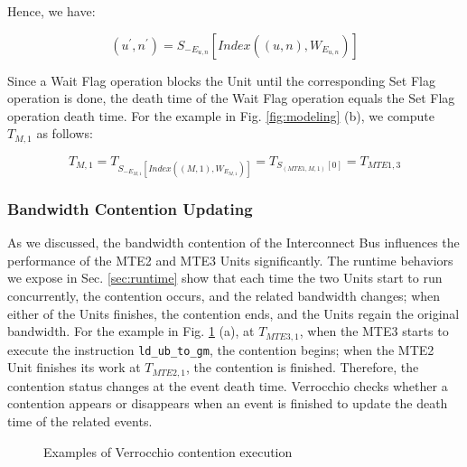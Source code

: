 Hence, we have:

\begin{equation}
(u^{\prime}, n^{\prime}) = S_{- E_{u, n}}[Index((u, n), W_{E_{u, n}})]
\end{equation}

Since a Wait Flag operation blocks the Unit until the corresponding Set Flag operation is done, the death time of the Wait Flag operation equals the Set Flag operation death time. For the example in Fig. \ref{fig:modeling} (b), we compute $T_{M, 1}$ as follows:

\begin{equation}
\label{eq:wait}
T_{M, 1} = T_{S_{-E_{M, 1}}[Index((M, 1), W_{E_{M, 1}})]}
    = T_{S_{(MTE1, M, 1)}[0]}
    = T_{MTE1, 3}
\end{equation}

\subsubsection{Bandwidth Contention Updating}

As we discussed, the bandwidth contention of the Interconnect Bus influences the performance of the MTE2 and MTE3 Units significantly. The runtime behaviors we expose in Sec. \ref{sec:runtime} show that each time the two Units start to run concurrently, the contention occurs, and the related bandwidth changes; when either of the Units finishes, the contention ends, and the Units regain the original bandwidth. For the example in Fig. \ref{fig:contention} (a), at $T_{MTE3, 1}$, when the MTE3 starts to execute the instruction \verb|ld_ub_to_gm|, the contention begins; when the MTE2 Unit finishes its work at $T_{MTE2, 1}$, the contention is finished. Therefore, the contention status changes at the event death time. Verrocchio checks whether a contention appears or disappears when an event is finished to update the death time of the related events.

\begin{figure}[tbp]
    \caption{Examples of Verrocchio contention execution}
    \label{fig:contention}
\end{figure}

